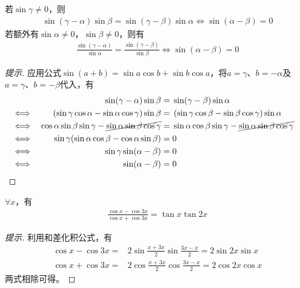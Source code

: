 \begin{example}\label{ex:sin(alpha-beta)=0}
  若$\sin\gamma\ne0$，则
  \begin{align*}
    \sin(\gamma-\alpha)\sin\beta = \sin(\gamma-\beta)\sin\alpha \iff
    \sin(\alpha - \beta) = 0
  \end{align*}
  若额外有$\sin\alpha\ne 0$，$\sin\beta\ne 0$，则有
  \begin{align*}
    \frac{\sin(\gamma-\alpha)}{\sin\alpha} = \frac{\sin(\gamma-\beta)}{\sin\beta} \iff
    \sin(\alpha - \beta) = 0
  \end{align*}
\end{example}
\begin{proof}[提示]
  应用公式$\sin(a + b) = \sin a \cos b + \sin b \cos a$，将$a= \gamma$、$b=-\alpha$及$a=\gamma$、$b=-\beta$代入，有
  \begin{align*}
    &&\sin(\gamma-\alpha)\sin\beta ={}& \sin(\gamma-\beta)\sin\alpha \\
    \iff &&
           \left(\sin\gamma\cos\alpha - \sin\alpha\cos\gamma\right) \sin\beta ={}& 
           \left(\sin\gamma\cos\beta -  \sin\beta \cos\gamma\right) \sin\alpha\\
    \iff&&
          \cos\alpha\sin\beta\sin\gamma - \cancel{\sin\alpha\sin\beta\cos\gamma}={}&
          \sin\alpha\cos\beta\sin\gamma - \cancel{\sin\alpha\sin\beta\cos\gamma}\\
    \iff&& \sin\gamma(\sin\alpha\cos\beta - \cos\alpha\sin\beta) ={}& 0\\
    \iff&& \sin\gamma\sin(\alpha-\beta) ={}& 0\\
    \iff&& \sin(\alpha - \beta) ={}& 0 & \qedhere
  \end{align*}
\end{proof}

\begin{example}
  $\forall x$，有
  \begin{align*}
    \frac{\cos x-\cos 3x}{\cos x+\cos 3x} = \tan x \tan 2x
  \end{align*}
\end{example}
\begin{proof}[提示]
  利用和差化积公式，有
  \begin{align*}
    \cos x - \cos 3x ={}& 2\sin\frac{x + 3x}{2} \sin\frac{3x-x}{2} = 2\sin2x\sin x\\[3pt]
    \cos x + \cos 3x ={}& 2\cos\frac{x + 3x}{2} \cos\frac{3x-x}{2} = 2\cos2x\cos x
  \end{align*}
  两式相除可得。
\end{proof}

